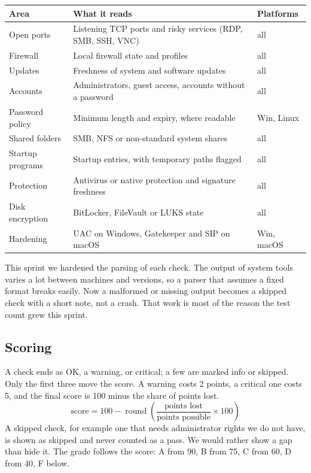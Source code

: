 \documentclass[11pt,a4paper]{article}
\begin{document}
\begin{table}[h]
\centering\small
\begin{tabular}{@{}lll@{}}
\toprule
Area & What it reads & Platforms \\
\midrule
Open ports & Listening TCP ports and risky services (RDP, SMB, SSH, VNC) & all \\
Firewall & Local firewall state and profiles & all \\
Updates & Freshness of system and software updates & all \\
Accounts & Administrators, guest access, accounts without a password & all \\
Password policy & Minimum length and expiry, where readable & Win, Linux \\
Shared folders & SMB, NFS or non-standard system shares & all \\
Startup programs & Startup entries, with temporary paths flagged & all \\
Protection & Antivirus or native protection and signature freshness & all \\
Disk encryption & BitLocker, FileVault or LUKS state & all \\
Hardening & UAC on Windows, Gatekeeper and SIP on macOS & Win, macOS \\
\bottomrule
\end{tabular}
\end{table}

This sprint we hardened the parsing of each check. The output of system tools varies a
lot between machines and versions, so a parser that assumes a fixed format breaks
easily. Now a malformed or missing output becomes a skipped check with a short note,
not a crash. That work is most of the reason the test count grew this sprint.

\subsection*{Scoring}

A check ends as OK, a warning, or critical; a few are marked info or skipped. Only the
first three move the score. A warning costs 2 points, a critical one costs 5, and the
final score is 100 minus the share of points lost.
\[
\text{score} = 100 - \operatorname{round}\!\left(\frac{\text{points lost}}{\text{points possible}} \times 100\right)
\]
A skipped check, for example one that needs administrator rights we do not have, is
shown as skipped and never counted as a pass. We would rather show a gap than hide it.
The grade follows the score: A from 90, B from 75, C from 60, D from 40, F below.
\end{document}
